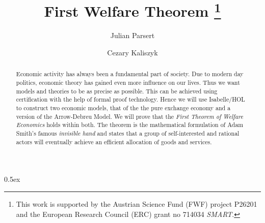 \documentclass[11pt,a4paper]{article}
\begin{document}
\title{First Welfare Theorem \thanks{%
This work is supported by the Austrian Science Fund (FWF) project P26201 and the European Research Council (ERC) grant no 714034 \emph{SMART}.}}

\author{Julian Parsert \and Cezary Kaliszyk}

\maketitle

\begin{abstract}
  Economic activity has always been a fundamental part of society.
  Due to modern day politics, economic theory has gained even more
  influence on our lives. Thus we want models and theories to be as
  precise as possible. This can be achieved using
  certification with the help of formal proof technology. Hence we
  will use Isabelle/HOL to construct two economic models, that of the the pure
  exchange economy and a version of the Arrow-Debreu Model. We will
  prove that the \emph{First Theorem of Welfare Economics} holds
  within both. The theorem is the mathematical formulation of Adam
  Smith's famous \emph{invisible hand} and states that a group of
  self-interested and rational actors will eventually achieve an
  efficient allocation of goods and services.
\end{abstract}

\tableofcontents

\parindent 0pt\parskip 0.5ex

\end{document}

